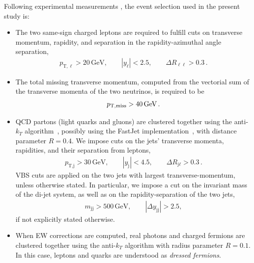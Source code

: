 \documentclass[twocolumn,epjc3]{svjour3} %
\newcommand{\Pl}{\ell}
\newcommand{\Pj}{\ensuremath{\text{j}}\xspace}
\newcommand{\GeV}{\ensuremath{\,\text{GeV}}\xspace}
\newcommand{\ptsub}[1]{\ensuremath{p_{\text{T},#1}}\xspace}
\newcommand{\etsub}[1]{\ensuremath{E_{\text{T},#1}}\xspace}
\begin{document}
    Following experimental measurements \cite{Aad:2014zda,Aaboud:2016ffv,Khachatryan:2014sta,CMS:2017adb}, the event selection used in the present study is:

    \begin{itemize}
        \item The two same-sign charged leptons are required to fulfill cuts on transverse momentum, rapidity, and separation in the rapidity-azimuthal angle separation, 
            \begin{align}
            \label{cut:1}
             \ptsub{\Pl} >  20\GeV,\qquad |y_{\Pl}| < 2.5, \qquad \Delta R_{\Pl\Pl}> 0.3\,.
            \end{align}
        \item The total missing transverse momentum, computed from the vectorial sum of the transverse momenta of the two neutrinos, is required to be
            \begin{align}
            \label{cut:2}
              p_{\rm T, miss} >  40\GeV\,.
            \end{align}
        \item QCD partons (light quarks and gluons) are clustered together using the anti-$k_T$ algorithm~\cite{Cacciari:2008gp}, possibly using the {\sc FastJet} implementation~\cite{Cacciari:2011ma}, with distance parameter $R=0.4$. %
        We impose cuts on the jets' transverse momenta, rapidities, and their separation from leptons,  
            \begin{align}
            \label{cut:3}
             \ptsub{\Pj} >  30\GeV, \qquad |y_\Pj| < 4.5, \qquad \Delta R_{\Pj\Pl} > 0.3 \,.
            \end{align}
            VBS cuts are applied on the two jets with largest transverse-momentum, unless otherwise stated. In particular, we impose a cut on the 
             in\-vari\-ant mass of the di-jet system,  as well as on the rapidity-separation of the two jets,          \begin{align}
            \label{cut:4}
             m_{\Pj \Pj} >  500\GeV,\qquad |\Delta y_{\Pj \Pj}| > 2.5, 
            \end{align}
            if not explicitly stated otherwise. 
        \item When EW corrections are computed, real photons and charged fermions are clustered together using the anti-$k_T$ algorithm with
            radius parameter $R=0.1$. In this case, leptons and quarks are understood as {\it dressed fermions}.
    \end{itemize}
\end{document}
